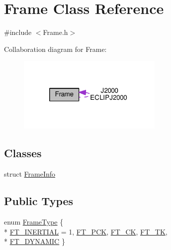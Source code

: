 \hypertarget{class_frame}{\section{Frame Class Reference}
\label{class_frame}
}


{\ttfamily \#include $<$Frame.\+h$>$}



Collaboration diagram for Frame\+:\nopagebreak
\begin{figure}[H]
\begin{center}
\leavevmode
\includegraphics[width=197pt]{class_frame__coll__graph}
\end{center}
\end{figure}
\subsection*{Classes}
\begin{DoxyCompactItemize}
\item 
struct \hyperlink{struct_frame_1_1_frame_info}{Frame\+Info}
\end{DoxyCompactItemize}
\subsection*{Public Types}
\begin{DoxyCompactItemize}
\item 
enum \hyperlink{class_frame_ad2f22450377db20233914c9ec0a21df4}{Frame\+Type} \{ \\*
\hyperlink{class_frame_ad2f22450377db20233914c9ec0a21df4ac73961ac9e615a4da4339c8e20fe92ef}{F\+T\+\_\+\+I\+N\+E\+R\+T\+I\+A\+L} = 1, 
\hyperlink{class_frame_ad2f22450377db20233914c9ec0a21df4a03c1983206078ccc3fd8c290a5d63019}{F\+T\+\_\+\+P\+C\+K}, 
\hyperlink{class_frame_ad2f22450377db20233914c9ec0a21df4a4438b3590992adb7e998575e686a995b}{F\+T\+\_\+\+C\+K}, 
\hyperlink{class_frame_ad2f22450377db20233914c9ec0a21df4a3a52c9b5914442b7ca49e20720257800}{F\+T\+\_\+\+T\+K}, 
\\*
\hyperlink{class_frame_ad2f22450377db20233914c9ec0a21df4ad682b0691e051ce65913fdf42d4be1af}{F\+T\+\_\+\+D\+Y\+N\+A\+M\+I\+C}
 \}
\end{DoxyCompactItemize}
